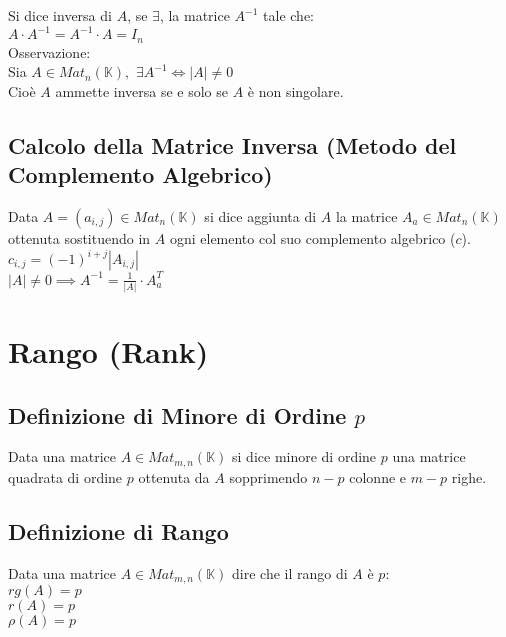 \documentclass[a4paper, twoside, italian, 11pt]{book}
\newcommand{\detm}[1] {\left | #1 \right |}
\newcommand{\K}{\mathbb K}
\begin{document}
Si dice inversa di $A$, se $\exists$, la matrice $A^{-1}$ tale che: \\

\noindent
$A \cdot A^{-1} = A^{-1} \cdot A = I_n$ \\

\noindent
Osservazione: \\
Sia $A \in Mat_n(\K),$ $\exists A^{-1} \iff \detm A \neq 0$ \\

\noindent
Cioè $A$ ammette inversa se e solo se $A$ è non singolare.


\subsection{Calcolo della Matrice Inversa (Metodo del Complemento Algebrico)}

Data $A = (a_{i,j}) \in Mat_n(\K)$ si dice aggiunta di $A$ la matrice $A_a \in Mat_n(\K)$ ottenuta sostituendo in $A$ ogni elemento col suo complemento algebrico ($c$). \\

\noindent
$c_{i,j} = (-1)^{i+j} \detm{A_{i,j}}$ \\

\noindent
$\detm A \neq 0 \implies A^{-1} = \frac{1}{\detm A} \cdot A_a^T$



\section{Rango (Rank)}



\subsection{Definizione di Minore di Ordine $p$}

Data una matrice $A \in Mat_{m,n}(\K)$ si dice minore di ordine $p$ una matrice quadrata di ordine $p$ ottenuta da $A$ sopprimendo $n-p$ colonne e $m-p$ righe.


\subsection{Definizione di Rango}

Data una matrice $A \in Mat_{m,n}(\K)$ dire che il rango di $A$ è $p$: \\

\noindent
$rg(A) = p$ \\
$r(A) = p$ \\
$\rho(A) = p$ \\
\end{document}
